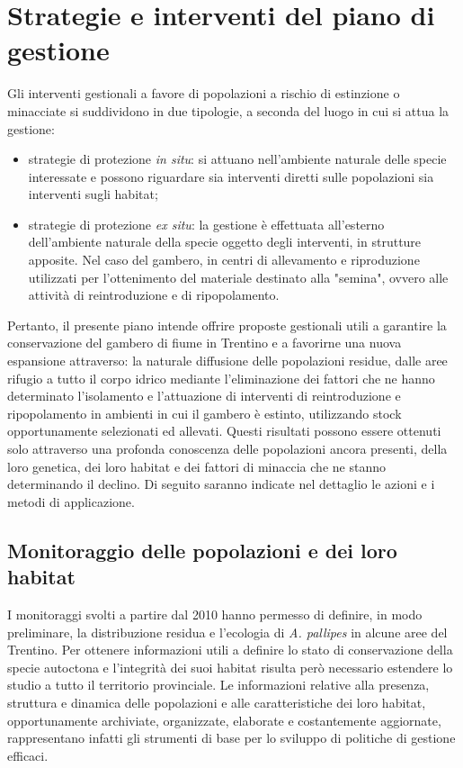 \documentclass[11pt,a4paper,italian,twoside,openany]{memoir}
\newcommand\BackgroundPicTwo{
  \put(0,0){
    \parbox[b][\paperheight]{\paperwidth}{%
      \vfill
      \centering
      \texttt{[image: 2.pdf]}
      \vfill
    }
  }
}
\newcommand\DeactivateBG{\backgroundsetup{contents={}}}
\begin{document}
\chapter{Strategie e interventi del piano di gestione}
\DeactivateBG
\AddToShipoutPicture*{\BackgroundPicTwo}

Gli interventi gestionali a favore di popolazioni a rischio di estinzione o minacciate si suddividono in due tipologie, a seconda del luogo in cui si attua la gestione:
\begin{itemize}
  \item strategie di protezione \emph{in situ}: si attuano nell'ambiente naturale delle specie interessate e possono riguardare sia interventi diretti sulle popolazioni sia interventi sugli habitat;
  \item strategie di protezione \emph{ex situ}: la gestione è effettuata all'esterno dell'ambiente naturale della specie oggetto degli interventi, in strutture apposite. Nel caso del gambero, in centri di allevamento e riproduzione utilizzati per l'ottenimento del materiale destinato alla "semina", ovvero alle attività di reintroduzione e di ripopolamento.
\end{itemize}

Pertanto, il presente piano intende offrire proposte gestionali utili a garantire la conservazione del gambero di fiume in Trentino e a favorirne una nuova espansione attraverso: la naturale diffusione delle popolazioni residue, dalle aree rifugio a tutto il corpo idrico mediante l'eliminazione dei fattori che ne hanno determinato l'isolamento e l'attuazione di interventi di reintroduzione e ripopolamento in ambienti in cui il gambero è estinto, utilizzando stock opportunamente selezionati ed allevati. Questi risultati possono essere ottenuti solo attraverso una profonda conoscenza delle popolazioni ancora presenti, della loro genetica, dei loro habitat e dei fattori di minaccia che ne stanno determinando il declino. Di seguito saranno indicate nel dettaglio le azioni e i metodi di applicazione. 

\section{Monitoraggio delle popolazioni e dei loro habitat}
\label{sec_monitoraggio_pop}
I monitoraggi svolti a partire dal 2010 hanno permesso di definire, in modo preliminare, la distribuzione residua e l'ecologia di \emph{A. pallipes} in alcune aree del Trentino. Per ottenere informazioni utili a definire lo stato di conservazione della specie autoctona e l'integrità dei suoi habitat risulta però necessario estendere lo studio a tutto il territorio provinciale. Le informazioni relative alla presenza, struttura e dinamica delle popolazioni e alle caratteristiche dei loro habitat, opportunamente archiviate, organizzate, elaborate e costantemente aggiornate, rappresentano infatti gli strumenti di base per lo sviluppo di politiche di gestione efficaci. 
\end{document}
